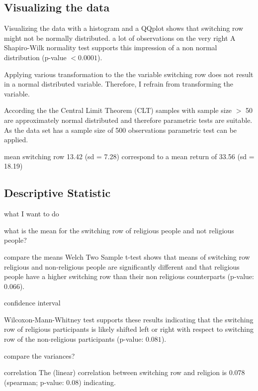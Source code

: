\documentclass[12pt,a4paper]{article}
\begin{document}
\subsection{Visualizing the data }
Visualizing the data with a histogram and a QQplot shows that switching row might not be normally distributed. 
a lot of observations on the very right   
A Shapiro-Wilk normality test supports this impression of a non normal distribution (p-value $< 0.0001$).\\
\begin{figure}
\scalebox{0.6}{
}
\end{figure}
Applying various transformation to the the variable switching row does not result in a normal distributed variable. Therefore, I refrain from transforming the variable. 

According the the Central Limit Theorem (CLT) samples with sample size $>$ 50 are approximately normal distributed and therefore parametric tests are suitable. As the data set has a sample size of 500 observations parametric test can be applied. 
 


mean switching row 13.42 (sd = 7.28) correspond to a mean return of 33.56 (sd = 18.19)


\subsection{Descriptive Statistic}
what I want to do 

what is the mean for the switching row of religious people and not religious people? 


compare the means 
Welch Two Sample t-test shows that means of switching row religious and non-religious people are significantly different and that religious people have a higher switching row than their non religious counterparts (p-value: $0.066$). 


confidence interval 

Wilcoxon-Mann-Whitney test supports these results indicating that the switching row of religious participants is likely shifted left or right with respect to switching row of the non-religious participants (p-value: $0.081$). 

compare the variances? 

correlation 
The (linear) correlation between switching row and religion is 0.078 (spearman; p-value: 0.08) indicating.  
\end{document}
